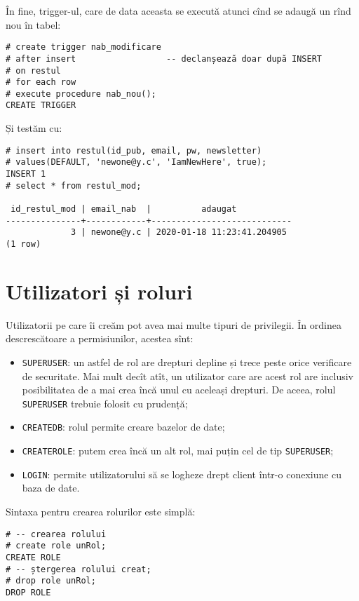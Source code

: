 În fine, trigger-ul, care de data aceasta se execută atunci cînd
se adaugă un rînd nou în tabel:
{
  \small
\begin{verbatim}
# create trigger nab_modificare
# after insert                  -- declanșează doar după INSERT
# on restul
# for each row
# execute procedure nab_nou();
CREATE TRIGGER
\end{verbatim}
}

Și testăm cu:
{
  \small
\begin{verbatim}
# insert into restul(id_pub, email, pw, newsletter) 
# values(DEFAULT, 'newone@y.c', 'IamNewHere', true);
INSERT 1
# select * from restul_mod;

 id_restul_mod | email_nab  |          adaugat           
---------------+------------+----------------------------
             3 | newone@y.c | 2020-01-18 11:23:41.204905
(1 row)
\end{verbatim}
}

\section{Utilizatori și roluri}

Utilizatorii pe care îi creăm pot avea mai multe tipuri de privilegii. În ordinea
descrescătoare a permisiunilor, acestea sînt:
\begin{itemize}
\item \texttt{SUPERUSER}: un astfel de rol are drepturi depline și trece peste
  orice verificare de securitate. Mai mult decît atît, un utilizator care are
  acest rol are inclusiv posibilitatea de a mai crea încă unul cu aceleași
  drepturi. De aceea, rolul \texttt{SUPERUSER} trebuie folosit cu prudență;
\item \texttt{CREATEDB}: rolul permite creare bazelor de date;
\item \texttt{CREATEROLE}: putem crea încă un alt rol, mai puțin cel de tip
  \texttt{SUPERUSER};
\item \texttt{LOGIN}: permite utilizatorului să se logheze drept client
  într-o conexiune cu baza de date.
\end{itemize}

Sintaxa pentru crearea rolurilor este simplă:
{
  \small
\begin{verbatim}
# -- crearea rolului
# create role unRol;
CREATE ROLE
# -- ștergerea rolului creat;
# drop role unRol;
DROP ROLE
\end{verbatim}
}

